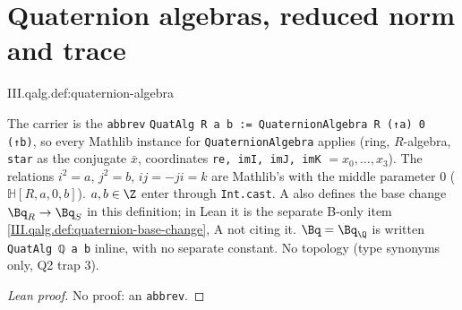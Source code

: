 \section{Quaternion algebras, reduced norm and trace}\label{sec:qalg-basic}

\begin{definition}
\end{definition}
\begin{tfformal}{III.qalg.def:quaternion-algebra}
\begin{tffidelity}
The carrier is the \texttt{abbrev} \texttt{QuatAlg R a b := QuaternionAlgebra R (↑a) 0 (↑b)}, so every Mathlib instance for \texttt{QuaternionAlgebra} applies (ring, $R$-algebra, \texttt{star} as the conjugate $\bar x$, coordinates \texttt{re, imI, imJ, imK} $=x_0,\dots,x_3$). The relations $i^2=a$, $j^2=b$, $ij=-ji=k$ are Mathlib's with the middle parameter $0$ ($\mathbb H[R,a,0,b]$). $a,b\in\Z$ enter through \texttt{Int.cast}. A also defines the base change $\Bq_R\to\Bq_S$ in this definition; in Lean it is the separate B-only item \cref{III.qalg.def:quaternion-base-change}, A not citing it. $\Bq=\Bq_\Q$ is written \texttt{QuatAlg ℚ a b} inline, with no separate constant. No topology (type synonyms only, Q2 trap 3).
\end{tffidelity}
\end{tfformal}
\begin{proof}[Lean proof]
No proof: an \texttt{abbrev}.
\end{proof}

